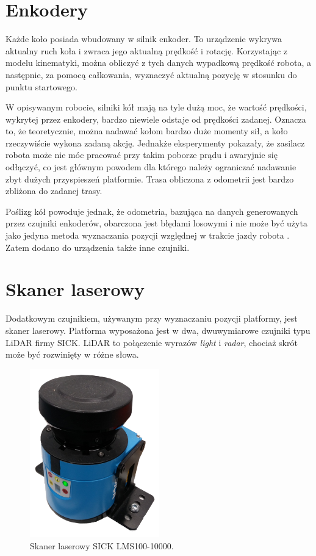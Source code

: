 \section{Enkodery}
	\label{sec:encoders}
	Każde koło posiada wbudowany w silnik enkoder. To urządzenie wykrywa aktualny ruch koła i zwraca jego aktualną prędkość i rotację.
	Korzystając z modelu kinematyki, można obliczyć z tych danych wypadkową prędkość robota, a następnie, za pomocą całkowania, wyznaczyć aktualną
	pozycję w stosunku do punktu startowego.
	
	W opisywanym robocie, silniki kół mają na tyle dużą moc, że wartość prędkości, wykrytej przez enkodery, bardzo niewiele odstaje od prędkości zadanej.
	Oznacza to, że teoretycznie, można nadawać kołom bardzo duże momenty sił, a koło rzeczywiście wykona zadaną akcję.
	Jednakże eksperymenty pokazały, że zasilacz robota może nie móc pracować przy takim poborze prądu i awaryjnie się odłączyć, co jest głównym powodem dla którego 
	należy ograniczać nadawanie zbyt dużych przyspieszeń platformie. Trasa obliczona z odometrii jest bardzo zbliżona do zadanej trasy.

	Poślizg kół powoduje jednak, że odometria, bazująca na danych generowanych przez czujniki enkoderów, obarczona jest błędami losowymi i nie może być 
	użyta jako jedyna metoda wyznaczania pozycji względnej w trakcie jazdy robota \cite{heavy}. Zatem dodano do urządzenia także inne czujniki.
	
\section{Skaner laserowy}
	\label{sec:lidar}
	Dodatkowym czujnikiem, używanym przy wyznaczaniu pozycji platformy, jest skaner laserowy.
	Platforma wyposażona jest w dwa, dwuwymiarowe czujniki typu LiDAR firmy SICK.
	LiDAR to połączenie wyrazów \emph{light} i \emph{radar}, chociaż skrót może być rozwinięty w różne słowa.

	\begin{figure}[h]
	\centering
	\includegraphics[width=0.5\textwidth]{graphics/sensor.png}
	\caption{Skaner laserowy SICK LMS100-10000.}
	\label{fig:sensor}
	\end{figure} 

